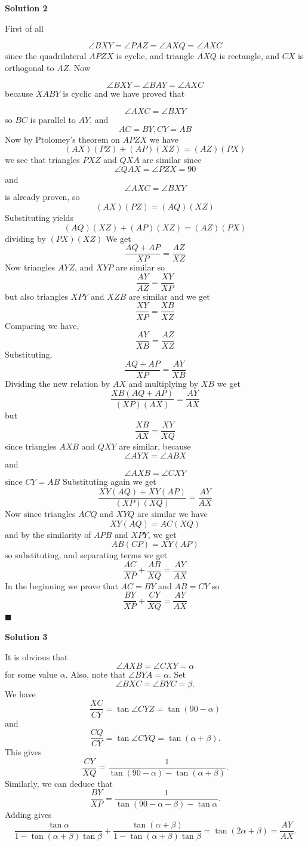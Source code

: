 \begin{enumerate}
 



\textbf{Solution 2}

First of all 

 
 \[\angle BXY = \angle PAZ =\angle AXQ =\angle AXC\] since the quadrilateral $APZX$ is cyclic, and triangle $AXQ$ is rectangle, and $CX$ is orthogonal to $AZ$. Now 

 
 \[\angle BXY =\angle BAY =\angle AXC\] because $XABY$ is cyclic and we have proved that 

 
 \[\angle AXC = \angle BXY\] so $BC$ is parallel to $AY$, and 
 \[AC=BY, CY=AB\] Now by Ptolomey's theorem on $APZX$ we have 
 \[(AX)(PZ)+(AP)(XZ)=(AZ)(PX)\] we see that triangles $PXZ$ and $QXA$ are similar since 
 \[\angle QAX= \angle PZX= 90\] and 
 \[\angle AXC = \angle BXY\] is already proven, so 
 \[(AX)(PZ)=(AQ)(XZ)\] Substituting yields 
 \[(AQ)(XZ)+(AP)(XZ)=(AZ)(PX)\] dividing by $(PX)(XZ)$ We get 
 \[\frac {AQ+AP}{XP} = \frac {AZ}{XZ}\] Now triangles $AYZ$, and $XYP$ are similar so 
 \[\frac {AY}{AZ}= \frac {XY}{XP}\] but also triangles $XPY$ and $XZB$ are similar and we get 
 \[\frac {XY}{XP}= \frac {XB}{XZ}\] Comparing we have, 
 \[\frac {AY}{XB}= \frac {AZ}{XZ}\] Substituting, 
 \[\frac {AQ+AP}{XP}= \frac {AY}{XB}\] Dividing the new relation by $AX$ and multiplying by $XB$ we get 
 \[\frac{XB(AQ+AP)}{(XP)(AX)} = \frac {AY}{AX}\] but 
 \[\frac {XB}{AX}= \frac {XY}{XQ}\] since triangles $AXB$ and $QXY$ are similar, because 
 \[\angle AYX= \angle ABX\] and 
 \[\angle AXB= \angle CXY\] since $CY=AB$ Substituting again we get 
 \[\frac {XY(AQ)+XY(AP)}{(XP)(XQ)} =\frac {AY}{AX}\] Now since triangles $ACQ$ and $XYQ$ are similar we have 
 \[XY(AQ)=AC(XQ)\] and by the similarity of $APB$ and $XPY$, we get 
 \[AB(CP)=XY(AP)\] so substituting, and separating terms we get 
 \[\frac{AC}{XP} + \frac{AB}{XQ} = \frac{AY}{AX}\] In the beginning we prove that $AC=BY$ and $AB=CY$ so 
 \[\frac{BY}{XP} + \frac{CY}{XQ} = \frac{AY}{AX}\] $\blacksquare$




\textbf{Solution 3}

It is obvious that 
 \[\angle AXB=\angle CXY=\alpha\]for some value $\alpha$. Also, note that $\angle BYA=\alpha$. Set 
 \[\angle BXC=\angle BYC=\beta.\] We have
 \[\frac{XC}{CY}=\tan {\angle CYZ}=\tan (90-\alpha)\]and 
 \[\frac{CQ}{CY}=\tan {\angle CYQ}=\tan (\alpha+\beta).\]This gives
 \[\frac{CY}{XQ}=\frac{1}{\tan (90-\alpha)-\tan (\alpha+\beta)}.\]Similarly, we can deduce that 
 \[\frac{BY}{XP}=\frac{1}{\tan (90-\alpha-\beta)-\tan {\alpha}}.\]Adding gives
 \[\frac{\tan \alpha}{1-\tan (\alpha+\beta)\tan {\beta}}+\frac{\tan (\alpha+\beta)}{1-\tan (\alpha+\beta)\tan {\beta}}=\tan (2\alpha +\beta)=\frac{AY}{AX}.\]





\end{enumerate}
